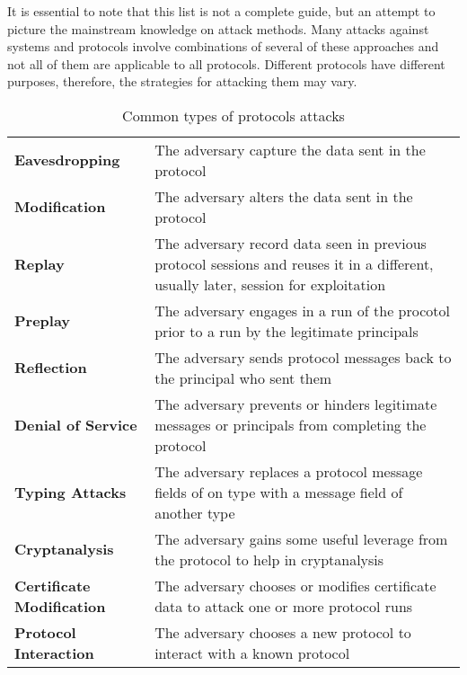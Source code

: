 It is essential to note that this list is not a complete guide, but an attempt to picture the mainstream knowledge on attack methods. Many attacks against systems and protocols involve combinations of several of these approaches and not all of them are applicable to all protocols. Different protocols have different purposes, therefore, the strategies for attacking them may vary.

\begin{table}\label{protocol-attacks}
  \caption{Common types of protocols attacks}

  {\def\arraystretch{1.5}
  \begin{tabular}[c]{l p{10cm}}
    \toprule
    \textbf{Eavesdropping} & The adversary capture the data sent in the protocol \\
    \textbf{Modification} & The adversary alters the data sent in the protocol \\
    \textbf{Replay} & The adversary record data seen in previous protocol sessions and reuses it in a different, usually later, session for exploitation \\
    \textbf{Preplay} & The adversary engages in a run of the procotol prior to a run by the legitimate principals \\
    \textbf{Reflection} & The adversary sends protocol messages back to the principal who sent them \\
    \textbf{Denial of Service} & The adversary prevents or hinders legitimate messages or principals from completing the protocol \\
    \textbf{Typing Attacks} & The adversary replaces a protocol message fields of on type with a message field of another type \\
    \textbf{Cryptanalysis} & The adversary gains some useful leverage from the protocol to help in cryptanalysis \\
    \textbf{Certificate Modification} & The adversary chooses or modifies certificate data to attack one or more protocol runs \\
    \textbf{Protocol Interaction} & The adversary chooses a new protocol to interact with a known protocol \\
    \bottomrule
  \end{tabular}
  }

\end{table}

